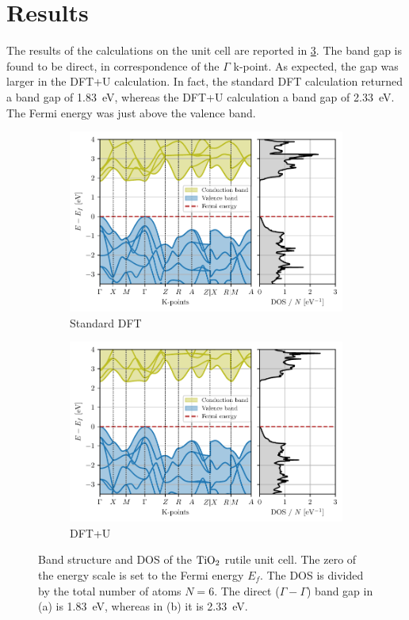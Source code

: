 \section{Results}
The results of the calculations on the unit cell are reported in \cref{fig:bands_unit}. The band gap is found to be direct, in correspondence of the $\Gamma$ k-point. As expected, the gap was larger in the DFT+U calculation. In fact, the standard DFT calculation returned a band gap of \SI{1.83}{eV}, whereas the DFT+U calculation a band gap of \SI{2.33}{eV}. The Fermi energy was just above the valence band.


\begin{figure}
    \centering
    \begin{subfigure}[t]{0.95\textwidth}
        \centering
        \includegraphics[width=\textwidth]{figures/unit_cell}
        \caption{Standard DFT}
        \label{fig:bands_unit_dft}
    \end{subfigure}
    \begin{subfigure}[t]{0.95\textwidth}
        \centering
        \includegraphics[width=\textwidth]{figures/unit_cell_u}
        \caption{DFT+U}
        \label{fig:bands_unit_dft+u}
    \end{subfigure}
    \caption{Band structure and DOS of the $\ce{TiO_2}$ rutile unit cell. The zero of the energy scale is set to the Fermi energy $E_f$. The DOS is divided by the total number of atoms $N = 6$.
        The direct ($\Gamma - \Gamma$) band gap in (a) is \SI{1.83}{eV}, whereas in (b) it is \SI{2.33}{eV}.}
    \label{fig:bands_unit}
\end{figure}

